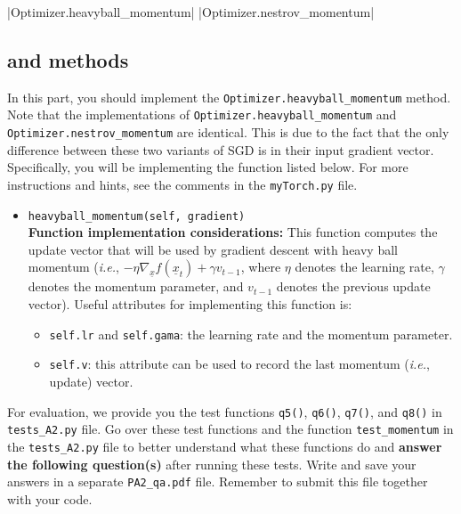 \documentclass{article}
\theoremstyle{definition}
\begin{document}
|Optimizer.heavyball_momentum|
|Optimizer.nestrov_momentum|
\subsection{ and  methods}\label{mom}
In this part, you should implement the  \verb|Optimizer.heavyball_momentum| method. Note that the implementations of \verb|Optimizer.heavyball_momentum| and \verb|Optimizer.nestrov_momentum| are identical. This is due to the fact that the only difference between these two variants of SGD is in their input gradient vector. Specifically, you will be implementing the function listed below. For more instructions and hints, see the comments in the \verb|myTorch.py| file.
\begin{itemize}
	\item{\verb|heavyball_momentum(self, gradient)|\\\textbf{Function implementation considerations:}
		This function computes the update vector that will be used by gradient descent with heavy ball momentum (\emph{i.e.}, $-\eta \nabla_{\!\underline{x}}f(\underline{x}_t) + \gamma v_{t-1}$, where $\eta$ denotes the learning rate, $\gamma$ denotes the momentum parameter, and $v_{t-1}$ denotes the previous update vector). 
		Useful attributes for implementing this function is: 
		\begin{itemize}
			\item \verb|self.lr| and \verb|self.gama|: the learning rate and the momentum parameter.
			\item \verb|self.v|: this attribute can be used to record the last momentum (\emph{i.e.}, update) vector. 
	\end{itemize}}
\end{itemize}
For evaluation, we provide you the test functions \verb|q5()|, \verb|q6()|, \verb|q7()|, and \verb|q8()| in \verb|tests_A2.py| file. Go over these test functions and the function \verb|test_momentum| in the \verb|tests_A2.py| file to better understand what these functions do and \textbf{answer the following question(s)} after running these tests. Write and save your answers in a separate \verb|PA2_qa.pdf| file. Remember to submit this file together with your code.
\end{document}
